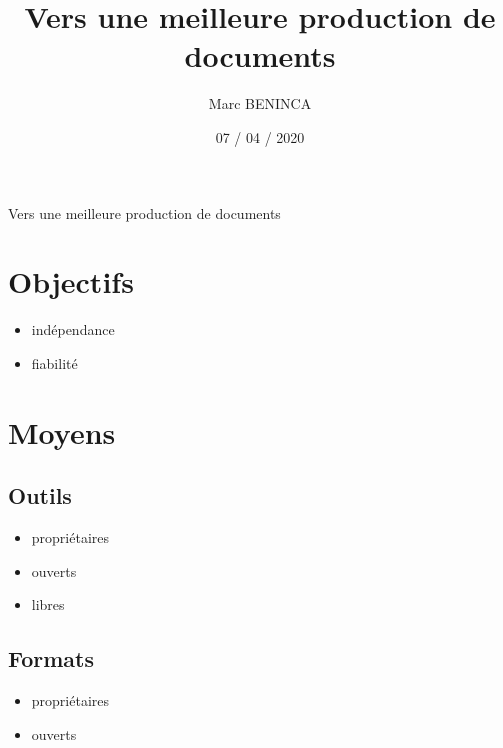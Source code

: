 \documentclass[20pt]{extarticle}
\begin{document}
\title{Vers une meilleure\newline
production de documents}
\author{Marc BENINCA}
\date{07 / 04 / 2020}
\maketitle
\pagebreak
Vers une meilleure production de documents
\renewcommand{\contentsname}{Sommaire}
\renewcommand{\cftsecleader}{\hfill}
\renewcommand{\cftsubsecleader}{\hfill}
\tableofcontents
\pagebreak
\section{Objectifs}

\begin{itemize}
\item{indépendance}
\item{fiabilité}
\end{itemize}

\pagebreak
\section{Moyens}

\subsection{Outils}
\begin{itemize}
\item{propriétaires}
\item{ouverts}
\item{libres}
\end{itemize}

\subsection{Formats}
\begin{itemize}
\item{propriétaires}
\item{ouverts}
\end{itemize}
\end{document}

